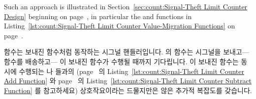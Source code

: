 Such an approach is illustrated in
Section~\ref{sec:count:Signal-Theft Limit Counter Design}
beginning on
page~\pageref{sec:count:Signal-Theft Limit Counter Design},
in particular the  and
 functions in
Listing~\ref{lst:count:Signal-Theft Limit Counter Value-Migration Functions}
on
page~\pageref{lst:count:Signal-Theft Limit Counter Value-Migration Functions}.

\fi

 함수는 보내진 함수처럼 동작하는 시그널
핸들러입니다.
 의  함수는 시그널을 보내고---함수를
배송하고--- 이 보내진 함수가 수행될 때까지 기다립니다.
이 보내진 함수는 동시에 수행되는  나  들과의
(page~\pageref{lst:count:Signal-Theft Limit Counter Add Function} 의
Listing~\ref{lst:count:Signal-Theft Limit Counter Add Function} 와
page~\pageref{lst:count:Signal-Theft Limit Counter Subtract Function} 의
Listing~\ref{lst:count:Signal-Theft Limit Counter Subtract Function} 를
참고하세요) 상호작요이라는 드물지만은 않은 추가적 복잡도를 갖습니다.

\iffalse

The \co{flush_local_count_sig()} function is a signal handler that
acts as the shipped function.
The \co{pthread_kill()} function in \co{flush_local_count()}
sends the signal---shipping the function---and then waits until
the shipped function executes.
This shipped function has the not-unusual added complication of
needing to interact with any concurrently executing \co{add_count()}
or \co{sub_count()} functions (see
Listing~\ref{lst:count:Signal-Theft Limit Counter Add Function}
on
page~\pageref{lst:count:Signal-Theft Limit Counter Add Function} and
Listing~\ref{lst:count:Signal-Theft Limit Counter Subtract Function}
on
page~\pageref{lst:count:Signal-Theft Limit Counter Subtract Function}).

\fi

